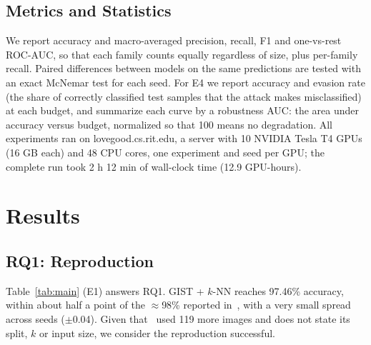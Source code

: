 \documentclass[conference]{IEEEtran}
\newcommand{\todo}[1]{\textcolor{red}{[TODO: #1]}}
\newcommand{\inputgen}[1]{\IfFileExists{generated/#1}{}{\todo{run make reproduce to generate #1}}}
\begin{document}
\subsection{Metrics and Statistics}
We report accuracy and macro-averaged precision, recall, F1 and one-vs-rest ROC-AUC,
so that each family counts equally regardless of size, plus per-family recall.
Paired differences between models on the same predictions are tested with an exact
McNemar test for each seed. For E4 we report accuracy and evasion rate (the share of
correctly classified test samples that the attack makes misclassified) at each
budget, and summarize each curve by a robustness AUC: the area under accuracy versus
budget, normalized so that 100 means no degradation.
All experiments ran on lovegood.cs.rit.edu, a server with 10 NVIDIA Tesla T4 GPUs (16 GB each) and 48 CPU cores, one experiment
and seed per GPU; the complete run took 2 h 12 min of wall-clock time
(12.9 GPU-hours).

\section{Results}
\begin{table}[t]
\centering
\caption{Mean $\pm$ std over seeds (out-of-fold, pooled per seed).}
\label{tab:main}
\resizebox{\textwidth}{!}{\inputgen{table_main.tex}}
\end{table}


\subsection{RQ1: Reproduction}
Table~\ref{tab:main} (E1) answers RQ1.
GIST + $k$-NN reaches 97.46\% accuracy, within about half a point of the
$\approx$98\% reported in~\cite{nataraj2011images}, with a very small spread across
seeds ($\pm$0.04). Given that~\cite{nataraj2011images} used 119 more images and
does not state its split, $k$ or input size, we consider the reproduction successful.
\end{document}
